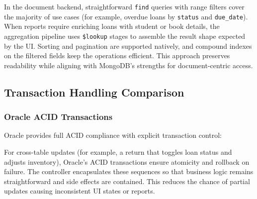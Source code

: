 \documentclass[12pt,a4paper]{article}
\begin{document}
In the document backend, straightforward \texttt{find} queries with range filters cover the majority of use cases (for example, overdue loans by \texttt{status} and \texttt{due\_date}). When reports require enriching loans with student or book details, the aggregation pipeline uses \texttt{\$lookup} stages to assemble the result shape expected by the UI. Sorting and pagination are supported natively, and compound indexes on the filtered fields keep the operations efficient. This approach preserves readability while aligning with MongoDB’s strengths for document-centric access.

\subsection{Transaction Handling Comparison}

\subsubsection{Oracle ACID Transactions}
Oracle provides full ACID compliance with explicit transaction control:

\begin{comment}
\begin{lstlisting}[language=Java, caption=Oracle Transaction Management]
public boolean returnBook(int loanId) throws SQLException {
    Connection conn = connectionManager.getConnection();
    try {
        conn.setAutoCommit(false);
        
        // Update loan status
        loanDAO.updateLoanStatus(loanId, "RETURNED", LocalDate.now());
        
        // Update book availability
        Loan loan = loanDAO.getLoanById(loanId);
        bookDAO.incrementAvailableCopies(loan.getBookId());
        
        conn.commit();
        return true;
    } catch (SQLException e) {
        conn.rollback();
        throw e;
    } finally {
        conn.setAutoCommit(true);
    }
}
\end{lstlisting}
\end{comment}

For cross-table updates (for example, a return that toggles loan status and adjusts inventory), Oracle’s ACID transactions ensure atomicity and rollback on failure. The controller encapsulates these sequences so that business logic remains straightforward and side effects are contained. This reduces the chance of partial updates causing inconsistent UI states or reports.
\end{document}
